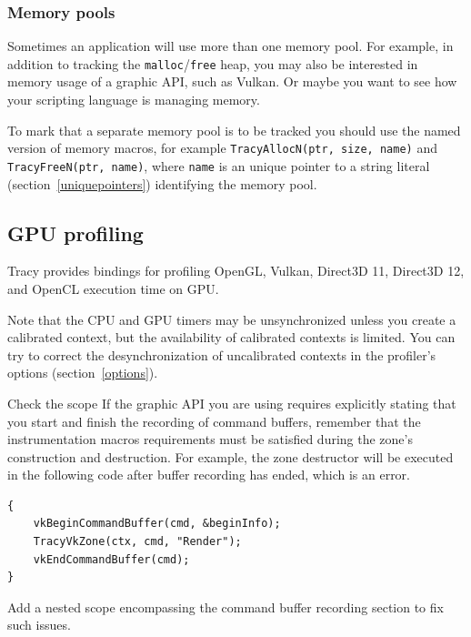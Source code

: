 \documentclass[hidelinks,titlepage,a4paper,twoside]{article}
\begin{document}
\subsubsection{Memory pools}
\label{memorypools}

Sometimes an application will use more than one memory pool. For example, in addition to tracking the \texttt{malloc}/\texttt{free} heap, you may also be interested in memory usage of a graphic API, such as Vulkan. Or maybe you want to see how your scripting language is managing memory.

To mark that a separate memory pool is to be tracked you should use the named version of memory macros, for example \texttt{TracyAllocN(ptr, size, name)} and \texttt{TracyFreeN(ptr, name)}, where \texttt{name} is an unique pointer to a string literal (section~\ref{uniquepointers}) identifying the memory pool.

\subsection{GPU profiling}
\label{gpuprofiling}

Tracy provides bindings for profiling OpenGL, Vulkan, Direct3D 11, Direct3D 12, and OpenCL execution time on GPU.

Note that the CPU and GPU timers may be unsynchronized unless you create a calibrated context, but the availability of calibrated contexts is limited. You can try to correct the desynchronization of uncalibrated contexts in the profiler's options (section~\ref{options}).

\begin{bclogo}[
noborder=true,
couleur=black!5,
logo=\bclampe
]{Check the scope}
If the graphic API you are using requires explicitly stating that you start and finish the recording of command buffers, remember that the instrumentation macros requirements must be satisfied during the zone's construction and destruction. For example, the zone destructor will be executed in the following code after buffer recording has ended, which is an error.

\begin{lstlisting}
{
    vkBeginCommandBuffer(cmd, &beginInfo);
    TracyVkZone(ctx, cmd, "Render");
    vkEndCommandBuffer(cmd);
}
\end{lstlisting}

Add a nested scope encompassing the command buffer recording section to fix such issues.
\end{bclogo}
\end{document}
